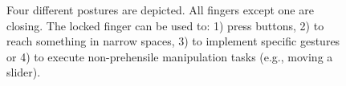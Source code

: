 \begin{figure}[ht]
\begin{center}
\end{center}
\caption{Four different postures are depicted. All fingers except one are closing. The locked finger can be used to: 1) press buttons, 2) to reach something in narrow spaces, 3) to implement specific gestures or 4) to execute non-prehensile manipulation tasks (e.g., moving a slider).} 
\label{Locked}
\end{figure} 


